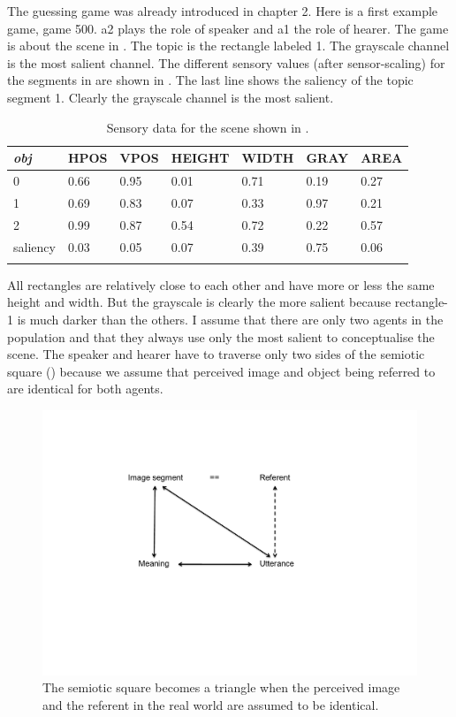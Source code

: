 The guessing game was already introduced in chapter 2. Here is a first example game, game 500.
{\bfshape  a2} plays the role of speaker and {\bfshape  a1} the role of hearer. The game is about the scene in
. The topic is the rectangle labeled 1. The grayscale channel is the most 
salient channel. The different sensory values (after sensor-scaling)
for the segments in  are shown in 
. The last line shows the saliency of 
the topic segment 1.  Clearly the grayscale channel is the most salient. 
\begin{table}
\begin{center}
\begin{tabular}{ l  l  l  l  l  l  l }
\lsptoprule
{\itshape obj} & HPOS & VPOS & HEIGHT & WIDTH & GRAY & AREA \\ \midrule
0 & 0.66 & 0.95 & 0.01 & 0.71 & 0.19 & 0.27\\ 
1 & 0.69 & 0.83 & 0.07 & 0.33 & 0.97 & 0.21\\ 
2 & 0.99 & 0.87 & 0.54 & 0.72 & 0.22 & 0.57\\ 
saliency & 0.03 & 0.05 & 0.07 & 0.39 & 0.75 & 0.06 \\ 
\lspbottomrule
\end{tabular}
\caption{\label{tab:t-rect1} Sensory data for the scene shown in .}
\end{center}
\end{table}
All rectangles are relatively close to each other and have more or less the 
same height and width. But the grayscale is clearly the more salient because rectangle-1 is 
much darker than the others. I assume that there are only two agents in the population and that they always use only 
the most salient to conceptualise the scene. 
The speaker and hearer have to traverse only 
two sides of the semiotic square ()
because we assume that perceived image and object being
referred to are identical for both agents. 
\begin{figure}[htbp]
  \centerline{\includegraphics[width=.50\textwidth]{chap6/figs/square6}}
\caption{\label{square6} The semiotic square becomes
a triangle when the perceived image and the referent in the
real world are assumed to be identical.} 
\end{figure}

